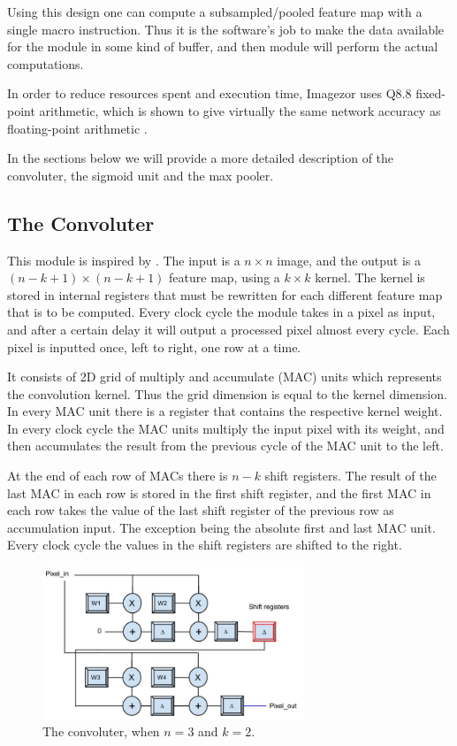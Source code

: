 Using this design one can compute a subsampled/pooled feature map with a single macro instruction. Thus it is the software's job to make the data available for the module in some kind of buffer, and then module will perform the actual computations.


In order to reduce resources spent and execution time, Imagezor uses Q8.8 fixed-point arithmetic, which is shown to give virtually the same network accuracy as floating-point arithmetic\cite{Napocensis2009} \cite{Holt1993} \cite{Chen2014}. 

In the sections below we will provide a more detailed description of the convoluter, the sigmoid unit and the max pooler. 


\subsection{The Convoluter} \label{sec_convoluter}

This module is inspired by \cite{Farabet2009}. The input is a $ n \times n $ image, and the output is a $ (n-k+1) \times (n-k+1) $ feature map, using a $ k \times k $ kernel. The kernel is stored in internal registers that must be rewritten for each different feature map that is to be computed. Every clock cycle the module takes in a pixel as input, and after a certain delay it will output a processed pixel almost every cycle. Each pixel is inputted once, left to right, one row at a time. 

It consists of 2D grid of multiply and accumulate (MAC) units which represents the convolution kernel. Thus the grid dimension is equal to the kernel dimension. In every MAC unit there is a register that contains the respective kernel weight. In every clock cycle the MAC units multiply the input pixel with its weight, and then accumulates the result from the previous cycle of the MAC unit to the left. 

At the end of each row of MACs there is $ n - k $ shift registers. The result of the last MAC in each row is stored in the first shift register, and the first MAC in each row takes the value of the last shift register of the previous row as accumulation input. The exception being the absolute first and last MAC unit. Every clock cycle the values in the shift registers are shifted to the right. 

\begin{figure}[h!]
  \centering
      \includegraphics[width=0.7\textwidth]{Figures/Method/Convolver}
  \caption[The convoluter ]{The convoluter, when $ n = 3 $ and $ k = 2 $.}
\end{figure}
	
